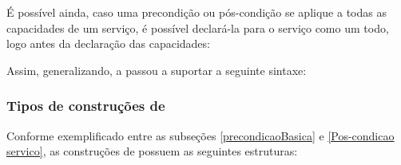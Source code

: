 \begin{center}
\end{center}

É possível ainda, caso uma precondição ou pós-condição se aplique a todas as
capacidades de um serviço, é possível declará-la para o serviço como um todo,
logo antes da declaração das capacidades:

\begin{center}
\end{center}

 Assim, generalizando, a \neoidl{} passou a suportar a seguinte sintaxe:
 
\begin{center}
\end{center}
 

\subsubsection{Tipos de construções de \designbycontract{}}
\label{TiposContrDbC}

Conforme exemplificado entre as subseções \ref{precondicaoBasica} e
\ref{Pos-condicao servico}, as construções de \designbycontract{} possuem as
seguintes estruturas:

\begin{center}

\end{center}


